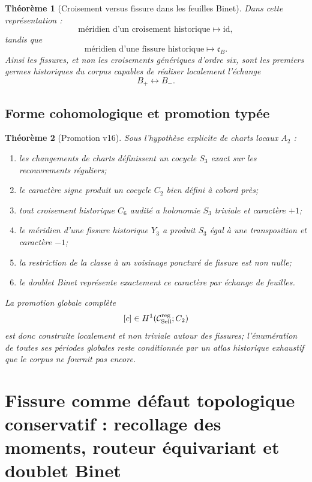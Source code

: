 \documentclass[11pt,a4paper]{article}
\newtheorem{theorem}{Théorème}[section]
\begin{document}
\begin{theorem}[Croisement versus fissure dans les feuilles Binet]\label{thm:v16-Binet-monodromy}
Dans cette représentation :
\[
 \boxed{
 \text{méridien d'un croisement historique}
 \longmapsto\mathrm{id},}
\]
tandis que
\[
 \boxed{
 \text{méridien d'une fissure historique}
 \longmapsto\mathfrak c_B.}
\]
Ainsi les fissures, et non les croisements génériques d'ordre six, sont les premiers germes historiques du corpus capables de réaliser localement l'échange
\[
 B_+\leftrightarrow B_-.
\]
\end{theorem}

\subsection{Forme cohomologique et promotion typée}

\begin{theorem}[Promotion v16]\label{thm:v16-promotion}
Sous l'hypothèse explicite de charts locaux $A_2$ :
\begin{enumerate}[label=\textup{(\roman*)}]
\item les changements de charts définissent un cocycle $S_3$ exact sur les recouvrements réguliers;
\item le caractère signe produit un cocycle $C_2$ bien défini à cobord près;
\item tout croisement historique $C_6$ audité a holonomie $S_3$ triviale et caractère $+1$;
\item le méridien d'une fissure historique $Y_3$ a produit $S_3$ égal à une transposition et caractère $-1$;
\item la restriction de la classe à un voisinage poncturé de fissure est non nulle;
\item le doublet Binet représente exactement ce caractère par échange de feuilles.
\end{enumerate}
La promotion globale complète
\[
 [c]\in H^1(\mathcal C_{\rm Sell}^{\rm reg};C_2)
\]
est donc \emph{construite localement et non triviale autour des fissures}; l'énumération de toutes ses périodes globales reste conditionnée par un atlas historique exhaustif que le corpus ne fournit pas encore.
\end{theorem}


\section{Fissure comme défaut topologique conservatif : recollage des moments, routeur équivariant et doublet Binet}\label{sec:v17-fissure-conservative}
\end{document}
